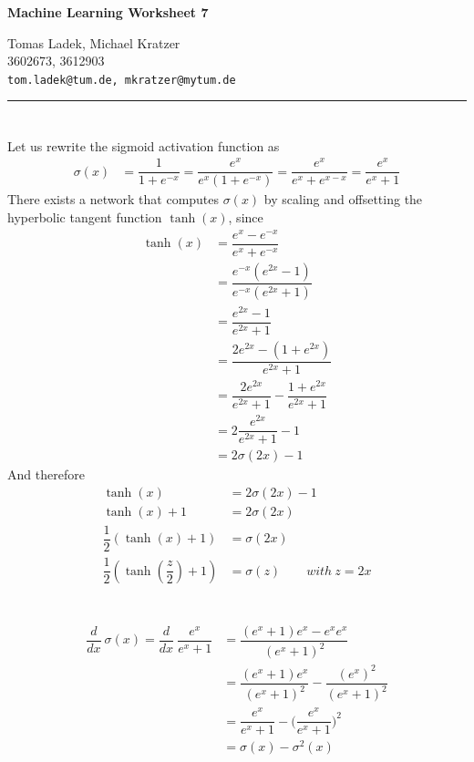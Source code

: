 \documentclass[11pt]{article}
\makeatletter
\newcommand{\exercise}{\section{}}
\newcommand{\hwhead}[4]{
\begin{center}
\sffamily\large\bfseries Machine Learning Worksheet #1
\vspace{2mm}
\normalfont

#2\\
#3\\
\texttt{#4}
\end{center}
\vspace{6mm} \hrule \vspace{4mm}
}
\newcommand{\names}{Tomas Ladek, Michael Kratzer} %
\newcommand{\imats}{3602673, 3612903} %
\newcommand{\emails}{tom.ladek@tum.de, mkratzer@mytum.de} %
\makeatother
\begin{document}
\hwhead{7}{\names}{\imats}{\emails}


\exercise
Let us rewrite the sigmoid activation function as
\begin{align*}
	\sigma(x) &= \dfrac{1}{1 + e^{-x}} = \dfrac{e^x}{e^x (1 + e^{-x})} = \dfrac{e^x}{e^x + e^{x-x}} = \dfrac{e^x}{e^x + 1}
\end{align*}
There exists a network that computes $\sigma(x)$ by scaling and offsetting the hyperbolic tangent function $\tanh(x)$, since
\begin{align*}
	\tanh(x) &= \dfrac{e^x - e^{-x}}{e^x + e^{-x}} \\
	&= \dfrac{e^{-x} (e^{2x} - 1)}{e^{-x} (e^{2x} + 1)} \\
	&= \dfrac{e^{2x} - 1}{e^{2x} + 1} \\
	&= \dfrac{2e^{2x} - (1 + e^{2x})}{e^{2x} + 1} \\
	&= \dfrac{2e^{2x}}{e^{2x} + 1} - \dfrac{1 + e^{2x}}{e^{2x} + 1}\\
	&= 2 \dfrac{e^{2x}}{e^{2x} + 1} - 1\\
	&= 2 \sigma(2x) - 1
\end{align*}
And therefore
\begin{align*}
	\tanh(x) &= 2 \sigma(2x) - 1\\
	\tanh(x) + 1 &= 2 \sigma(2x)\\
	\dfrac{1}{2} (\tanh(x) + 1) &= \sigma(2x)\\
	\dfrac{1}{2} (\tanh(\dfrac{z}{2}) + 1) &= \sigma(z) \quad\quad with\ z = 2x	
\end{align*}

\exercise
\begin{align*}
	\dfrac{d}{dx}\ \sigma(x) = \dfrac{d}{dx}\ \dfrac{e^x}{e^x + 1} &= \dfrac{(e^x + 1) e^x - e^x e^x}{(e^x + 1)^2}\\
	&= \dfrac{(e^{x} + 1)e^x}{(e^x + 1)^2} - \dfrac{(e^{x})^2}{(e^x + 1)^2}\\
	&= \dfrac{e^x}{e^x + 1} - \Big(\dfrac{e^x}{e^x + 1}\Big)^2\\
	&= \sigma(x) - \sigma^2(x)
\end{align*}
\end{document}
